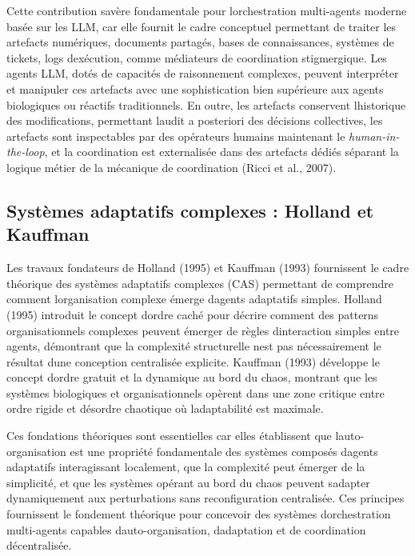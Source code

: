 \documentclass[12pt,a4paper]{article}
\begin{document}
Cette contribution s\textquotesingle avère fondamentale pour
l\textquotesingle orchestration multi-agents moderne basée sur les LLM,
car elle fournit le cadre conceptuel permettant de traiter les artefacts
numériques, documents partagés, bases de connaissances, systèmes de
tickets, logs d\textquotesingle exécution, comme médiateurs de
coordination stigmergique. Les agents LLM, dotés de capacités de
raisonnement complexes, peuvent interpréter et manipuler ces artefacts
avec une sophistication bien supérieure aux agents biologiques ou
réactifs traditionnels. En outre, les artefacts conservent
l\textquotesingle historique des modifications, permettant
l\textquotesingle audit a posteriori des décisions collectives, les
artefacts sont inspectables par des opérateurs humains maintenant le
\emph{human-in-the-loop}, et la coordination est externalisée dans des
artefacts dédiés séparant la logique métier de la mécanique de
coordination (Ricci et al., 2007).

\subsection{Systèmes adaptatifs complexes : Holland et
Kauffman}\label{systuxe8mes-adaptatifs-complexes--holland-et-kauffman}

Les travaux fondateurs de Holland (1995) et Kauffman (1993) fournissent
le cadre théorique des systèmes adaptatifs complexes (CAS) permettant de
comprendre comment l\textquotesingle organisation complexe émerge
d\textquotesingle agents adaptatifs simples. Holland (1995) introduit le
concept d\textquotesingle ordre caché pour décrire comment des patterns
organisationnels complexes peuvent émerger de règles
d\textquotesingle interaction simples entre agents, démontrant que la
complexité structurelle n\textquotesingle est pas nécessairement le
résultat d\textquotesingle une conception centralisée explicite.
Kauffman (1993) développe le concept d\textquotesingle ordre gratuit et
la dynamique au bord du chaos, montrant que les systèmes biologiques et
organisationnels opèrent dans une zone critique entre ordre rigide et
désordre chaotique où l\textquotesingle adaptabilité est maximale.

Ces fondations théoriques sont essentielles car elles établissent que
l\textquotesingle auto-organisation est une propriété fondamentale des
systèmes composés d\textquotesingle agents adaptatifs interagissant
localement, que la complexité peut émerger de la simplicité, et que les
systèmes opérant au bord du chaos peuvent s\textquotesingle adapter
dynamiquement aux perturbations sans reconfiguration centralisée. Ces
principes fournissent le fondement théorique pour concevoir des systèmes
d\textquotesingle orchestration multi-agents capables
d\textquotesingle auto-organisation, d\textquotesingle adaptation et de
coordination décentralisée.
\end{document}
